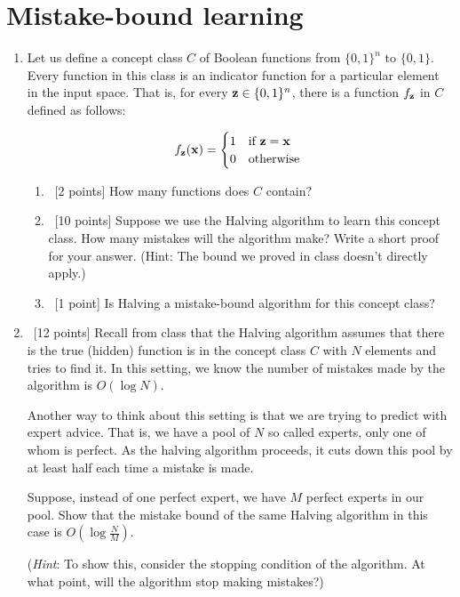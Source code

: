 \section{Mistake-bound learning}
\label{sec:mistake-bound-learning}

\begin{enumerate}
\item Let us define a concept class $C$ of Boolean functions from
  $\{0,1\}^n$ to $\{0, 1\}$. Every function in this class is an
  indicator function for a particular element in the input space. That
  is, for every ${\bf z} \in \{0, 1\}^n$, there is a function $f_{\bf z}$ in $C$
  defined as follows:

  \begin{equation}
    f_{\bf z}({\bf x}) = \begin{cases}
      1 & \mbox{if } {\bf z} = {\bf x} \\
      0 & \mbox{otherwise }
    \end{cases}
  \end{equation}

  \begin{enumerate}
  \item ~[2 points] How many functions does $C$ contain?

  \item ~[10 points] Suppose we use the Halving algorithm to learn this
    concept class. How many mistakes will the algorithm make? Write a
    short proof for your answer. (Hint: The bound we proved in class
    doesn't directly apply.)

  \item ~[1 point] Is Halving a mistake-bound algorithm for this
    concept class?
  \end{enumerate}

\item ~[12 points] Recall from class that the Halving algorithm
  assumes that there is the true (hidden) function is in the concept
  class $C$ with $N$ elements and tries to find it. In this setting,
  we know the number of mistakes made by the algorithm is $O(\log N)$.

  Another way to think about this setting is that we are trying to
  predict with expert advice. That is, we have a pool of $N$ so called
  experts, only one of whom is perfect. As the halving algorithm
  proceeds, it cuts down this pool by at least half each time a
  mistake is made.

  Suppose, instead of one perfect expert, we have $M$ perfect experts
  in our pool. Show that the mistake bound of the same Halving
  algorithm in this case is $O(\log \frac{N}{M})$.
  
  ({\em Hint}: To show this, consider the stopping condition of the
  algorithm. At what point, will the algorithm stop making mistakes?)
  
\end{enumerate}

